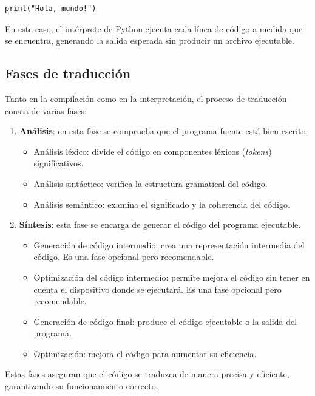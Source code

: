 \begin{verbatim}
print("Hola, mundo!")
\end{verbatim}

En este caso, el intérprete de Python ejecuta cada línea de código a medida que se encuentra, generando la salida esperada sin producir un archivo ejecutable.

\subsection{Fases de traducción}

Tanto en la compilación como en la interpretación, el proceso de traducción consta de varias fases:

\begin{enumerate}
    \item \textbf{Análisis}: en esta fase se comprueba que el programa fuente está bien escrito.
    \begin{itemize}
        \item Análisis léxico: divide el código en componentes léxicos (\textit{tokens}) significativos.
        \item Análisis sintáctico: verifica la estructura gramatical del código.
        \item Análisis semántico: examina el significado y la coherencia del código.
    \end{itemize}
    
    \item \textbf{Síntesis}: esta fase se encarga de generar el código del programa ejecutable.
    \begin{itemize}
        \item Generación de código intermedio: crea una representación intermedia del código. Es una fase opcional pero recomendable.
        \item Optimización del código intermedio: permite mejora el código sin tener en cuenta el dispositivo donde se ejecutará. Es una fase opcional pero recomendable.
        \item Generación de código final: produce el código ejecutable o la salida del programa.
        \item Optimización: mejora el código para aumentar su eficiencia.
    \end{itemize}
\end{enumerate}

Estas fases aseguran que el código se traduzca de manera precisa y eficiente, garantizando su funcionamiento correcto.

